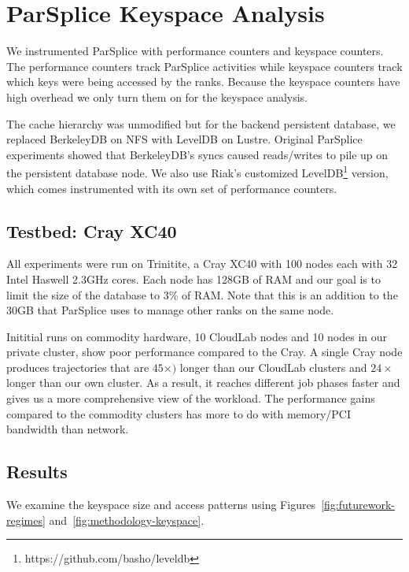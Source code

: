 \section{ParSplice Keyspace Analysis}

We instrumented ParSplice with performance counters and keyspace counters.  The
performance counters track ParSplice activities while keyspace counters track
which keys were being accessed by the ranks. Because the keyspace counters have
high overhead we only turn them on for the keyspace analysis.

The cache hierarchy was unmodified but for the backend persistent database, we
replaced BerkeleyDB on NFS with LevelDB on Lustre. Original ParSplice
experiments showed that BerkeleyDB's syncs caused reads/writes to pile up on
the persistent database node. We also use Riak's customized
LevelDB\footnote{https://github.com/basho/leveldb} version, which comes
instrumented with its own set of performance counters.

\subsection*{Testbed: Cray XC40}

All experiments were run on Trinitite, a Cray XC40 with 100 nodes each with 32
Intel Haswell 2.3GHz cores.  Each node has 128GB of RAM and our goal is to
limit the size of the database to 3\% of RAM. Note that this is an addition to
the 30GB that ParSplice uses to manage other ranks on the same node. 

Inititial runs on commodity hardware, 10 CloudLab nodes and 10 nodes in our
private cluster, show poor performance compared to the Cray. A single Cray node
produces trajectories that are \(45\times)\) longer than our CloudLab clusters
and \(24\times\) longer than our own cluster. As a result, it reaches different
job phases faster and gives us a more comprehensive view of the workload. The
performance gains compared to the commodity clusters has more to do with
memory/PCI bandwidth than network.

\subsection*{Results}
\label{sec:results}
We examine the keyspace size and access patterns using
Figures~\ref{fig:futurework-regimes} and~\ref{fig:methodology-keyspace}.


